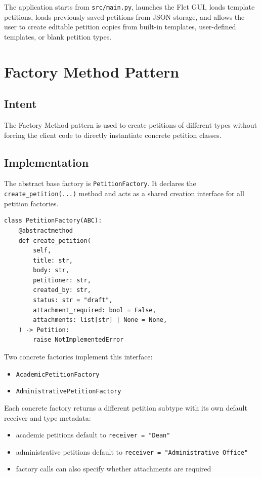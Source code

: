 \documentclass[11pt,a4paper]{article}
\begin{document}
The application starts from \texttt{src/main.py}, launches the Flet GUI, loads
template petitions, loads previously saved petitions from JSON storage, and
allows the user to create editable petition copies from built-in templates,
user-defined templates, or blank petition types.

\section{Factory Method Pattern}

\subsection{Intent}

The Factory Method pattern is used to create petitions of different types
without forcing the client code to directly instantiate concrete petition
classes.

\subsection{Implementation}

The abstract base factory is \texttt{PetitionFactory}. It declares the
\texttt{create\_petition(...)} method and acts as a shared creation interface
for all petition factories.

\begin{lstlisting}[style=pythonstyle,caption={Abstract petition factory}]
class PetitionFactory(ABC):
    @abstractmethod
    def create_petition(
        self,
        title: str,
        body: str,
        petitioner: str,
        created_by: str,
        status: str = "draft",
        attachment_required: bool = False,
        attachments: list[str] | None = None,
    ) -> Petition:
        raise NotImplementedError
\end{lstlisting}

Two concrete factories implement this interface:
\begin{itemize}[leftmargin=1.5em]
    \item \texttt{AcademicPetitionFactory}
    \item \texttt{AdministrativePetitionFactory}
\end{itemize}

Each concrete factory returns a different petition subtype with its own default
receiver and type metadata:
\begin{itemize}[leftmargin=1.5em]
    \item academic petitions default to \texttt{receiver = "Dean"}
    \item administrative petitions default to
    \texttt{receiver = "Administrative Office"}
    \item factory calls can also specify whether attachments are required
\end{itemize}
\end{document}
